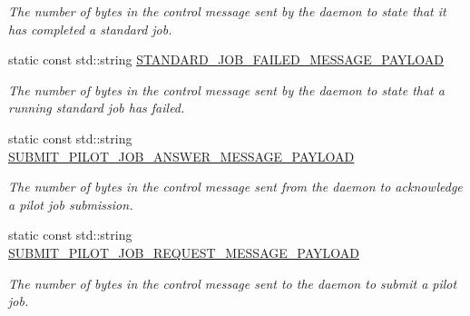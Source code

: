 \begin{DoxyCompactItemize}
\begin{DoxyCompactList}\small\item\em The number of bytes in the control message sent by the daemon to state that it has completed a standard job. \end{DoxyCompactList}\item 
\mbox{\label{classwrench_1_1_compute_service_message_payload_aafb88e732f10b7e26bd1fe39356457bf}} 
static const std\+::string \hyperlink{classwrench_1_1_compute_service_message_payload_aafb88e732f10b7e26bd1fe39356457bf}{S\+T\+A\+N\+D\+A\+R\+D\+\_\+\+J\+O\+B\+\_\+\+F\+A\+I\+L\+E\+D\+\_\+\+M\+E\+S\+S\+A\+G\+E\+\_\+\+P\+A\+Y\+L\+O\+AD}
\begin{DoxyCompactList}\small\item\em The number of bytes in the control message sent by the daemon to state that a running standard job has failed. \end{DoxyCompactList}\item 
\mbox{\label{classwrench_1_1_compute_service_message_payload_a421715521f0d2837e24e9e150da0de4a}} 
static const std\+::string \hyperlink{classwrench_1_1_compute_service_message_payload_a421715521f0d2837e24e9e150da0de4a}{S\+U\+B\+M\+I\+T\+\_\+\+P\+I\+L\+O\+T\+\_\+\+J\+O\+B\+\_\+\+A\+N\+S\+W\+E\+R\+\_\+\+M\+E\+S\+S\+A\+G\+E\+\_\+\+P\+A\+Y\+L\+O\+AD}
\begin{DoxyCompactList}\small\item\em The number of bytes in the control message sent from the daemon to acknowledge a pilot job submission. \end{DoxyCompactList}\item 
\mbox{\label{classwrench_1_1_compute_service_message_payload_aae15472660475257104b6717902fbffb}} 
static const std\+::string \hyperlink{classwrench_1_1_compute_service_message_payload_aae15472660475257104b6717902fbffb}{S\+U\+B\+M\+I\+T\+\_\+\+P\+I\+L\+O\+T\+\_\+\+J\+O\+B\+\_\+\+R\+E\+Q\+U\+E\+S\+T\+\_\+\+M\+E\+S\+S\+A\+G\+E\+\_\+\+P\+A\+Y\+L\+O\+AD}
\begin{DoxyCompactList}\small\item\em The number of bytes in the control message sent to the daemon to submit a pilot job. \end{DoxyCompactList}\item 

\end{DoxyCompactItemize}
